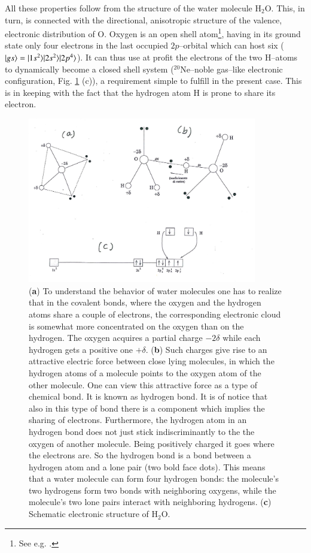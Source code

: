 \begin{subappendices}
All these properties follow from the structure of the water molecule H$_2$O. This, in turn, is connected with the directional, anisotropic structure of the valence, electronic distribution of O. Oxygen is an open shell atom\footnote{See e.g. \cite{Greiner:98}.}, having in its ground state only four electrons in the last occupied $2p$--orbital which can host six ($|{gs} \rangle=|{1s^2} \rangle|{2s^2} \rangle|{2p^4} \rangle$). It can thus use at profit the electrons of the two H--atoms to dynamically become a closed shell system ($^{20}$Ne--noble gas--like electronic configuration, Fig. \ref{fig6G5} (c)), a requirement simple to fulfill in the present case. This is in keeping with the fact that the hydrogen atom H is prone to share its electron.
\begin{figure}
\centerline{\includegraphics[width=10cm]{C8/figsC8/fig6G5.pdf}}
\caption{(\textbf{a}) To understand the behavior of water molecules one has to realize that in the covalent bonds, where the oxygen and the hydrogen atoms share a couple of electrons, the corresponding electronic cloud is somewhat more concentrated on the oxygen than on the hydrogen. The oxygen acquires a partial charge $-2\delta$ while each hydrogen gets a positive one $+\delta$. (\textbf{b}) Such charges give rise to an attractive electric force between  close lying molecules, in which the hydrogen atoms of a molecule points to the oxygen atom of the other molecule. One can view this attractive force as a type of chemical bond. It is known as hydrogen bond. It is of notice that also in this type of bond there is a component which implies the sharing of electrons. Furthermore, the hydrogen atom in an hydrogen bond does not just stick indiscriminantly to the the oxygen of another molecule. Being positively charged it goes where the electrons are. So the hydrogen bond is a bond between a hydrogen atom and a lone pair (two bold face dots). This means that a water molecule can form four hydrogen bonds: the molecule's two hydrogens form two bonds with neighboring oxygens, while the molecule's two lone pairs interact with neighboring hydrogens. (\textbf{c}) Schematic electronic structure of H$_2$O.}\label{fig6G5}

\end{figure}
\end{subappendices}
